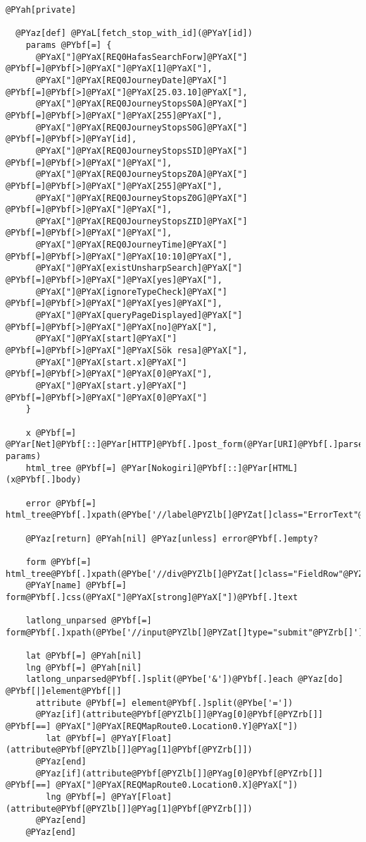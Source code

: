 \begin{Verbatim}[commandchars=@\[\]]
  @PYah[private]
  
  @PYaz[def] @PYaL[fetch_stop_with_id](@PYaY[id])
    params @PYbf[=] {
      @PYaX["]@PYaX[REQ0HafasSearchForw]@PYaX["]	@PYbf[=]@PYbf[>]@PYaX["]@PYaX[1]@PYaX["],
      @PYaX["]@PYaX[REQ0JourneyDate]@PYaX["]			@PYbf[=]@PYbf[>]@PYaX["]@PYaX[25.03.10]@PYaX["],
      @PYaX["]@PYaX[REQ0JourneyStopsS0A]@PYaX["]	@PYbf[=]@PYbf[>]@PYaX["]@PYaX[255]@PYaX["],
      @PYaX["]@PYaX[REQ0JourneyStopsS0G]@PYaX["]	@PYbf[=]@PYbf[>]@PYaY[id],
      @PYaX["]@PYaX[REQ0JourneyStopsSID]@PYaX["]	@PYbf[=]@PYbf[>]@PYaX["]@PYaX["],
      @PYaX["]@PYaX[REQ0JourneyStopsZ0A]@PYaX["]	@PYbf[=]@PYbf[>]@PYaX["]@PYaX[255]@PYaX["],
      @PYaX["]@PYaX[REQ0JourneyStopsZ0G]@PYaX["]	@PYbf[=]@PYbf[>]@PYaX["]@PYaX["],
      @PYaX["]@PYaX[REQ0JourneyStopsZID]@PYaX["]	@PYbf[=]@PYbf[>]@PYaX["]@PYaX["],
      @PYaX["]@PYaX[REQ0JourneyTime]@PYaX["]			@PYbf[=]@PYbf[>]@PYaX["]@PYaX[10:10]@PYaX["],
      @PYaX["]@PYaX[existUnsharpSearch]@PYaX["]	@PYbf[=]@PYbf[>]@PYaX["]@PYaX[yes]@PYaX["],
      @PYaX["]@PYaX[ignoreTypeCheck]@PYaX["]			@PYbf[=]@PYbf[>]@PYaX["]@PYaX[yes]@PYaX["],
      @PYaX["]@PYaX[queryPageDisplayed]@PYaX["]	@PYbf[=]@PYbf[>]@PYaX["]@PYaX[no]@PYaX["],
      @PYaX["]@PYaX[start]@PYaX["]						    @PYbf[=]@PYbf[>]@PYaX["]@PYaX[Sök resa]@PYaX["],
      @PYaX["]@PYaX[start.x]@PYaX["]						  @PYbf[=]@PYbf[>]@PYaX["]@PYaX[0]@PYaX["],
      @PYaX["]@PYaX[start.y]@PYaX["]						  @PYbf[=]@PYbf[>]@PYaX["]@PYaX[0]@PYaX["]
    }

    x @PYbf[=] @PYar[Net]@PYbf[::]@PYar[HTTP]@PYbf[.]post_form(@PYar[URI]@PYbf[.]parse(@PYaX["]@PYaX[http://reseplanerare.sl.se/bin/query.exe/sn]@PYaX["]), params)
    html_tree @PYbf[=] @PYar[Nokogiri]@PYbf[::]@PYar[HTML](x@PYbf[.]body)

    error @PYbf[=] html_tree@PYbf[.]xpath(@PYbe['//label@PYZlb[]@PYZat[]class="ErrorText"@PYZrb[]'])

    @PYaz[return] @PYah[nil] @PYaz[unless] error@PYbf[.]empty?

    form @PYbf[=] html_tree@PYbf[.]xpath(@PYbe['//div@PYZlb[]@PYZat[]class="FieldRow"@PYZrb[]'])@PYbf[.]first
    @PYaY[name] @PYbf[=] form@PYbf[.]css(@PYaX["]@PYaX[strong]@PYaX["])@PYbf[.]text

    latlong_unparsed @PYbf[=] form@PYbf[.]xpath(@PYbe['//input@PYZlb[]@PYZat[]type="submit"@PYZrb[]'])@PYbf[.]attribute(@PYaX["]@PYaX[name]@PYaX["])@PYbf[.]value

    lat @PYbf[=] @PYah[nil]
    lng @PYbf[=] @PYah[nil]
    latlong_unparsed@PYbf[.]split(@PYbe['&'])@PYbf[.]each @PYaz[do] @PYbf[|]element@PYbf[|]
      attribute @PYbf[=] element@PYbf[.]split(@PYbe['='])
      @PYaz[if](attribute@PYbf[@PYZlb[]]@PYag[0]@PYbf[@PYZrb[]] @PYbf[==] @PYaX["]@PYaX[REQMapRoute0.Location0.Y]@PYaX["])
        lat @PYbf[=] @PYaY[Float](attribute@PYbf[@PYZlb[]]@PYag[1]@PYbf[@PYZrb[]])
      @PYaz[end]
      @PYaz[if](attribute@PYbf[@PYZlb[]]@PYag[0]@PYbf[@PYZrb[]] @PYbf[==] @PYaX["]@PYaX[REQMapRoute0.Location0.X]@PYaX["])
        lng @PYbf[=] @PYaY[Float](attribute@PYbf[@PYZlb[]]@PYag[1]@PYbf[@PYZrb[]])
      @PYaz[end]
    @PYaz[end]


\end{Verbatim}
